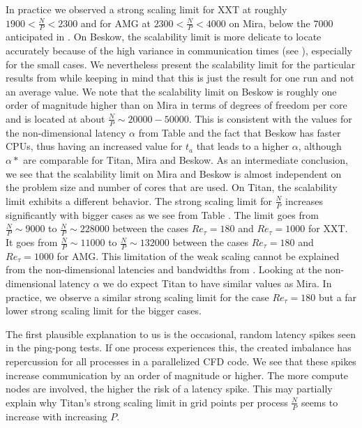 \documentclass{sig-alternate}
\begin{document}
In practice we observed a strong scaling limit for XXT at roughly $1900<
\frac{N}{P} < 2300$ and for AMG at $2300<\frac{N}{P}<4000$ on Mira, below the $7000$
anticipated in \cite{fischer:scaling}. On Beskow, the scalability limit is 
more delicate to locate accurately because 
of the high variance in communication times (see ), 
especially for the small cases. We nevertheless present the scalability limit for 
the particular results from  while keeping in mind that
this is just the result for one run and not an average value. We note that
the scalability limit on Beskow is roughly one order of magnitude higher than on 
Mira in terms of degrees of freedom per core and is located at about 
$\frac{N}{P} \sim 20000 - 50000$. This is consistent with the values for the
non-dimensional latency $\alpha$ %
from Table  
and the fact that Beskow has faster CPUs, thus having an increased value for
$t_a$ that leads to a higher $\alpha$, although $\alpha*$ are comparable for
Titan, Mira and Beskow. 
As an intermediate conclusion, we see that the scalability limit on Mira and Beskow
is almost independent on the problem size and number of cores that are used.  On
Titan, the scalability limit exhibits a different behavior.
The strong scaling limit for $\frac{N}{P}$ increases
significantly with bigger cases as we see from Table .
The limit goes from $\frac{N}{P} \sim 9000$ to $\frac{N}{P} \sim 228000$ between
the cases $Re_{\tau}=180$ and $Re_{\tau}=1000$ for XXT. It goes from
$\frac{N}{P} 
\sim 11000$ to $\frac{N}{P} \sim 132000$ between the cases $Re_{\tau}=180$ and 
$Re_{\tau}=1000$ for AMG. This limitation of the weak scaling cannot be explained 
from the non-dimensional latencies and bandwidths from . 
Looking at the non-dimensional latency $\alpha$ we do expect Titan to have similar values as Mira. 
In practice, we observe a similar strong scaling limit for the case $Re_{\tau} = 180$
but a far lower strong scaling limit for the bigger cases. 

The first plausible explanation to us is the occasional, random latency spikes seen in the ping-pong tests. If
one process experiences this, the created imbalance has repercussion for all
processes in a parallelized CFD code. We see that these spikes increase communication by
an order of magnitude or higher. The more compute nodes are involved, the higher
the risk of a latency spike. This may partially explain why Titan's strong
scaling limit in grid points per process $\frac{N}{P}$ seems to increase with increasing $P$.
\end{document}
